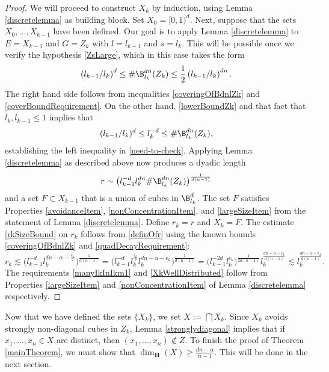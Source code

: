 \begin{proof} 
We will proceed to construct $X_k$ by induction, using Lemma \ref{discretelemma} as building block. Set $X_0=[0,1)^d$.  
Next, suppose that the sets $X_0,\ldots,X_{k-1}$ have been defined. Our goal is to apply Lemma \ref{discretelemma} to $E=X_{k-1}$ and $G=Z_k$ with $l=l_{k-1}$ and $s=l_k$. 
This will be possible once we verify the hypothesis \eqref{ZsLarge}, which in this case takes the form 
\begin{equation}  \left(l_{k-1}/l_k \right)^{d} \leq \#\B_{l_k}^{dn}(Z_k) \leq \frac{1}{2} \left(l_{k-1}/l_k \right)^{dn}. \label{need-to-check} \end{equation} 
The right hand side follows from inequalities \eqref{coveringOfBdnlZk} and \eqref{coverBoundRequirement}. 
On the other hand, \eqref{lowerBoundZk} and that fact that $l_k, l_{k-1}\leq 1$ implies that
$$
(l_{k-1}/l_k)^d\leq l_{k}^{-d}\leq \#\B_{l_k}^{dn}(Z_k), 
$$
establishing the left inequality in \eqref{need-to-check}. Applying Lemma \ref{discretelemma} as described above now produces a dyadic length 
\begin{equation}\label{definOfr}
r\sim \big(l_{k-1}^{-d}l_k^{dn} \# \B^{dn}_{l_k}(Z_k)\big)^{\frac{1}{d(n-1)}} 
\end{equation}
and a set $F\subset X_{k-1}$ that is a union of cubes in $\B_{l_k}^{d}$. The set $F$ satisfies Properties \ref{avoidanceItem}, \ref{nonConcentrationItem}, and \ref{largeSizeItem} from the statement of Lemma \ref{discretelemma}. Define $r_k=r$ and $X_k=F$. The estimate  \eqref{rkSizeBound} on $r_k$ follows from \eqref{definOfr} using the known bounds \eqref{coveringOfBdnlZk} and \eqref{quadDecayRequirement}:  
\[ r_k \lesssim \bigl( l_{k-1}^{-d}  l_k^{dn -\alpha - \frac{\epsilon_k}{2}} \bigr)^{\frac{1}{d(n-1)}} =  \bigl( l_{k-1}^{-d} l_k^{\frac{\epsilon_k}{2}} l_k^{dn -\alpha - \epsilon_k} \bigr)^{\frac{1}{d(n-1)}} = \bigl( l_{k-1}^{-2d} l_k^{\epsilon_k}\bigr)^{\frac{1}{2d(n-1)}} l_{k}^{\frac{dn-\alpha -\epsilon_k}{d(n-1)}} \lesssim l_{k}^{\frac{dn-\alpha -\epsilon_k}{d(n-1)}}. \] 
The requirements \eqref{manyIkInIkm1} and \eqref{XkWellDistributed} follow from Properties \ref{largeSizeItem} and \ref{nonConcentrationItem} of Lemma \ref{discretelemma} respectively.
\end{proof} 

Now that we have defined the sets $\{X_k\}$, we set $X:=\bigcap X_k$. Since $X_k$ avoids strongly non-diagonal cubes in $Z_{k}$, Lemma \ref{stronglydiagonal} implies that if $x_1, \dots, x_n \in X$ are distinct, then $(x_1, \dots, x_n) \not \in Z$. To finish the proof of Theorem \ref{mainTheorem}, we must show that $\dim_{\mathbf H}(X)\geq \frac{dn - \alpha}{n - 1}$. This will be done in the next section. 







